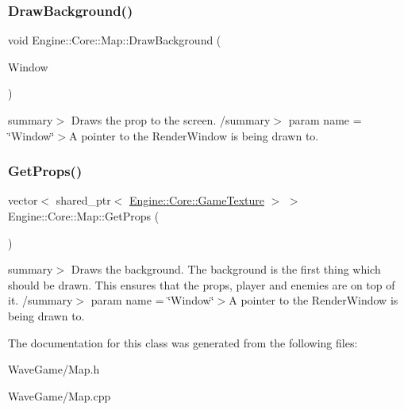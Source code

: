 \subsubsection{\texorpdfstring{Draw\+Background()}{DrawBackground()}}
{\footnotesize\ttfamily void Engine\+::\+Core\+::\+Map\+::\+Draw\+Background (\begin{DoxyParamCaption}\item[{shared\+\_\+ptr$<$ Render\+Window $>$}]{Window }\end{DoxyParamCaption})}

summary$>$ Draws the prop to the screen. /summary$>$ param name = \char`\"{}\+Window\char`\"{}$>$A pointer to the Render\+Window is being drawn to.\mbox{\label{class_engine_1_1_core_1_1_map_afafd62cdfe87b27796d0900e76aa09ea}} 
\subsubsection{\texorpdfstring{Get\+Props()}{GetProps()}}
{\footnotesize\ttfamily vector$<$ shared\+\_\+ptr$<$ \hyperlink{class_engine_1_1_core_1_1_game_texture}{Engine\+::\+Core\+::\+Game\+Texture} $>$ $>$ Engine\+::\+Core\+::\+Map\+::\+Get\+Props (\begin{DoxyParamCaption}\item[{void}]{ }\end{DoxyParamCaption})}

summary$>$ Draws the background. The background is the first thing which should be drawn. This ensures that the props, player and enemies are on top of it. /summary$>$ param name = \char`\"{}\+Window\char`\"{}$>$A pointer to the Render\+Window is being drawn to.

The documentation for this class was generated from the following files\+:\begin{DoxyCompactItemize}
\item 
Wave\+Game/Map.\+h\item 
Wave\+Game/Map.\+cpp\end{DoxyCompactItemize}
